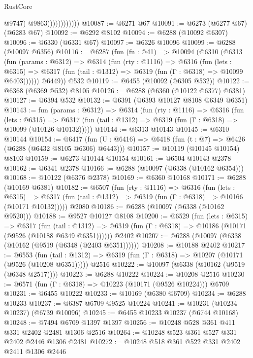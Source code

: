 \begin{lexlean}{RustCore}
\begin{coremodule}
                              @9747)
                            @9863))))))))))))
@10087 := @6271 @67
@10091 := @6273 (@6277 @67) (@6283 @67)
@10092 := @6292 @8102
@10094 := @6288 (@10092 @6307)
@10096 := @6330 (@6331 @67)
@10097 := @6326 @10096
@10099 := @6288 (@10097 @6356)
@10116 := @6287
    (fun (fn : @41) =>
    @10094
      (@6310
        (@6313
          (fun (params : @6312) =>
          @6314
            (fun (rty : @1116) =>
            @6316
              (fun (lets : @6315) =>
              @6317 (fun (tail : @1312) => @6319 (fun (Γ : @6318) => @10099 @6403))))))
        @6449))
    @532
@10119 := @6455 (@10092 (@6305 @532))
@10122 := @6368 (@6369 @532) @8105
@10126 := @6288 (@6360 (@10122 @6377) @6381)
@10127 := @6394 @532
@10132 := @6391 (@6393 @10127 @8108 @6349 @6351)
@10143 := fun (params : @6312) =>
  @6314
    (fun (rty : @1116) =>
    @6316
      (fun (lets : @6315) =>
      @6317 (fun (tail : @1312) => @6319 (fun (Γ : @6318) => @10099 (@10126 @10132)))))
@10144 := @6313 @10143
@10145 := @6310 @10144
@10154 := @6417 (fun (U : @6416) => @6418 (fun (t : @7) => @6426 (@6288 (@6432 @8105 @6306) @6443)))
@10157 := @10119 (@10145 @10154) @8103
@10159 := @6273 @10144 @10154
@10161 := @6504 @10143 @2378
@10162 := @6341 @2378
@10166 := @6288 (@10097 (@6338 (@10162 @6354)))
@10168 := @10122 (@6376 @2378)
@10169 := @6360 @10168
@10171 := @6288 (@10169 @6381)
@10182 := @6507
    (fun (rty : @1116) =>
    @6316
      (fun (lets : @6315) =>
      @6317 (fun (tail : @1312) => @6319 (fun (Γ : @6318) => @10166 (@10171 @10132)))))
    @2080
@10186 := @6288 (@10097 (@6338 (@10162 @9520)))
@10188 := @9527 @10127 @8108
@10200 := @6529
    (fun (lets : @6315) =>
    @6317
      (fun (tail : @1312) =>
      @6319 (fun (Γ : @6318) => @10186 (@10171 (@9526 (@10188 @6349 @6351))))))
    @2402
@10207 := @6288 (@10097 (@6338 (@10162 (@9519 (@6348 (@2403 @6351))))))
@10208 := @10188 @2402
@10217 := @6553
    (fun (tail : @1312) => @6319 (fun (Γ : @6318) => @10207 (@10171 (@9526 (@10208 @6351)))))
    @2516
@10222 := @10097 (@6338 (@10162 (@9519 (@6348 @2517))))
@10223 := @6288 @10222
@10224 := @10208 @2516
@10230 := @6571 (fun (Γ : @6318) => @10223 (@10171 (@9526 @10224))) @6709
@10231 := @6455 @10222
@10233 := @10169 (@6380 @6709)
@10234 := @6288 @10233
@10237 := @6387 @6709 @9525 @10224
@10241 := @10231 (@10234 @10237) (@6739 @10096)
@10245 := @6455 @10233 @10237 (@6744 @10168)
@10248 := @7494 @6709 @1397 @1397
@10256 := @10248 @528 @361 @411 @331 @2402 @2481 @1306 @2516
@10264 := @10248 @523 @361 @527 @331 @2402 @2446 @1306 @2481
@10272 := @10248 @518 @361 @522 @331 @2402 @2411 @1306 @2446

\end{coremodule}
\end{lexlean}
